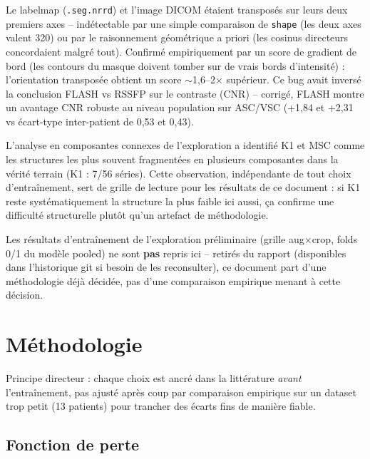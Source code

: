 \documentclass[11pt,a4paper]{report}
\begin{document}
\begin{description}[style=nextline]
    \item[Bug d'alignement H/W] Le labelmap (\texttt{.seg.nrrd}) et l'image DICOM
        étaient transposés sur leurs deux premiers axes -- indétectable par une
        simple comparaison de \texttt{shape} (les deux axes valent 320) ou par le
        raisonnement géométrique a priori (les cosinus directeurs concordaient malgré
        tout). Confirmé empiriquement par un score de gradient de bord (les contours
        du masque doivent tomber sur de vrais bords d'intensité) : l'orientation
        transposée obtient un score $\sim$1,6--2$\times$ supérieur. Ce bug avait
        inversé la conclusion FLASH vs RSSFP sur le contraste (CNR) -- corrigé, FLASH
        montre un avantage CNR robuste au niveau population sur ASC/VSC
        (+1,84 et +2,31 vs écart-type inter-patient de 0,53 et 0,43).
    \item[Fragmentation structurelle de K1] L'analyse en composantes connexes de
        l'exploration a identifié K1 et MSC comme les structures les plus souvent
        fragmentées en plusieurs composantes dans la vérité terrain (K1 : 7/56
        séries). Cette observation, indépendante de tout choix d'entraînement, sert
        de grille de lecture pour les résultats de ce document : si K1 reste
        systématiquement la structure la plus faible ici aussi, ça confirme une
        difficulté structurelle plutôt qu'un artefact de méthodologie.
\end{description}

Les résultats d'entraînement de l'exploration préliminaire (grille aug$\times$crop,
folds 0/1 du modèle pooled) ne sont \textbf{pas} repris ici -- retirés du rapport
(disponibles dans l'historique git si besoin de les reconsulter), ce document part
d'une méthodologie déjà décidée, pas d'une comparaison empirique menant à cette
décision.

\chapter{Méthodologie}
\label{chap:methodologie}

Principe directeur : chaque choix est ancré dans la littérature \emph{avant}
l'entraînement, pas ajusté après coup par comparaison empirique sur un dataset trop
petit (13 patients) pour trancher des écarts fins de manière fiable.

\section{Fonction de perte}
\end{document}

